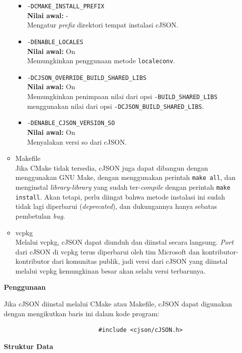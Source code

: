 \documentclass[a4paper,twoside]{article}
\begin{document}
\begin{enumerate}
\begin{itemize}
\begin{itemize}
		\item \verb|-DCMAKE_INSTALL_PREFIX|\\
		\textbf{Nilai awal:} -\\
		Mengatur \textit{prefix} direktori tempat instalasi cJSON.
		\item \verb|-DENABLE_LOCALES|\\
		\textbf{Nilai awal:} On\\
		Memungkinkan penggunaan metode \verb|localeconv|.
		\item \verb|-DCJSON_OVERRIDE_BUILD_SHARED_LIBS|\\
		\textbf{Nilai awal:} On\\
		Memungkinkan penimpaan nilai dari opsi \verb|-BUILD_SHARED_LIBS| menggunakan nilai dari opsi \verb|-DCJSON_BUILD_SHARED_LIBS|.
		\item \verb|-DENABLE_CJSON_VERSION_SO|\\
		\textbf{Nilai awal:} On\\
		Menyalakan versi so dari cJSON.
	\end{itemize}

	\item Makefile\\
	Jika CMake tidak tersedia, cJSON juga dapat dibangun dengan menggunakan GNU Make, dengan menggunakan perintah \verb|make all|, dan menginstal \textit{library-library} yang sudah ter-\textit{compile} dengan perintah \verb|make install|. Akan tetapi, perlu diingat bahwa metode instalasi ini sudah tidak lagi diperbarui (\textit{deprecated}), dan dukungannya hanya sebatas pembetulan \textit{bug}.
	
	\item vcpkg\\
	Melalui vcpkg, cJSON dapat diunduh dan diinstal secara langsung. \textit{Port} dari cJSON di vcpkg terus diperbarui oleh tim Microsoft dan kontributor-kontributor dari komunitas publik, jadi versi dari cJSON yang diinstal melalui vcpkg kemungkinan besar akan selalu versi terbarunya.
\end{itemize}

\textbf{Penggunaan}

Jika cJSON diinstal melalui CMake atau Makefile, cJSON dapat digunakan dengan mengikutkan baris ini dalam kode program:

\begin{verbatim}
                           #include <cjson/cJSON.h>
\end{verbatim}

\textbf{Struktur Data}


\end{enumerate}
\end{document}
